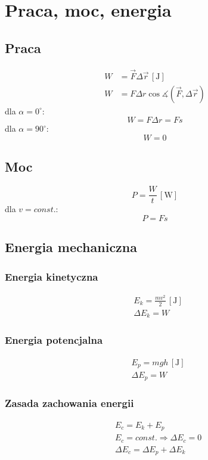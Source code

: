 \documentclass{article}
\numberwithin{equation}{section}
\newcommand{\unit}[1]{\, \left[\mathrm{#1}\right]}
\begin{document}
  \newpage
  \section{Praca, moc, energia}
    \subsection{Praca}
      \begin{align}
        W &= \vec F\Delta\vec r \unit{J}\\
        W &= F\Delta r \cos\measuredangle\left(\vec F, \Delta\vec r\right)
      \end{align}
      dla $\alpha = 0^\circ$:
      \begin{equation}
        W = F\Delta r = Fs
      \end{equation}
      dla $\alpha = 90^\circ$:
      \begin{equation}
        W = 0
      \end{equation}
    \subsection{Moc}
      \begin{equation}
        P = \frac{W}{t} \unit{W}
      \end{equation}
      dla $v = const.$:
      \begin{equation}
        P = Fs
      \end{equation}
    \subsection{Energia mechaniczna}
      \subsubsection{Energia kinetyczna}
        \begin{align}
          &E_k = \frac{mv^2}{2} \unit{J}\\
          &\Delta E_k = W
        \end{align}
      \subsubsection{Energia potencjalna}
        \begin{align}
          &E_p = mgh \unit{J}\\
          &\Delta E_p = W
        \end{align}
      \subsubsection{Zasada zachowania energii}
        \begin{align}
          &E_c = E_k + E_p\\
          &E_c = const. \Rightarrow \Delta E_c = 0\\
          &\Delta E_c = \Delta E_p + \Delta E_k
        \end{align}
\end{document}
